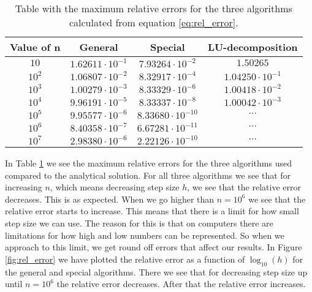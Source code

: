 \documentclass[12pt,a4paper,english]{article}
\begin{document}
\begin{table}[h!]
	\begin{tabular}{ |c|c|c|c| }
		\hline \rule{0pt}{13pt}
		Value of n&General &Special &LU-decomposition \\
		\hline \rule{0pt}{13pt}
		$10$&$1.62611\cdot10^{-1}$& $7.93264\cdot10^{-2}$ & $1.50265$\\
		\hline \rule{0pt}{13pt}
		$10^2$ & $1.06807\cdot10^{-2}$ & $8.32917\cdot10^{-4}$ & $1.04250\cdot10^{-1}$ \\
		\hline \rule{0pt}{13pt}
		$10^3$ & $1.00279\cdot10^{-3}$ & $8.33329\cdot10^{-6}$ & $1.00418\cdot10^{-2}$\\
		\hline \rule{0pt}{13pt}
		$10^4$ & $9.96191\cdot10^{-5}$ & $8.33337\cdot10^{-8}$ & $1.00042\cdot10^{-3}$\\
		\hline \rule{0pt}{13pt}
		$10^5$ & $9.95577\cdot10^{-6}$ & $8.33680\cdot10^{-10}$ & $\cdots$\\
		\hline \rule{0pt}{13pt}
		$10^6$ & $8.40358\cdot10^{-7}$ & $6.67281\cdot10^{-11}$ & $\cdots$\\
		\hline \rule{0pt}{13pt}
		$10^7$ & $2.98380\cdot10^{-6}$ & $2.22126\cdot10^{-10}$ & $\cdots$\\
		\hline
	\end{tabular}	
	\caption{Table with the maximum relative errors for the three algorithms calculated from equation \ref{eq:rel_error}.}
	\label{tab:error}
\end{table}
In Table \ref{tab:error} we see the maximum relative errors for the three algorithms used compared to the analytical solution. For all three algorithms we see that for increasing $n$, which means decreasing step size $h$, we see that the relative error decreases. This is as expected. When we go higher than $n=10^6$ we see that the relative error starts to increase. This means that there is a limit for how small step size we can use. The reason for this is that on computers there are limitations for how high and low numbers can be represented. So when we approach to this limit, we get round off errors that affect our results. In Figure \ref{fig:rel_error} we have plotted the relative error as a function of $\log_{10}(h)$ for the general and special algorithms. There we see that for decreasing step size up until $n=10^6$ the relative error decreases. After that the relative error increases.
\end{document}
